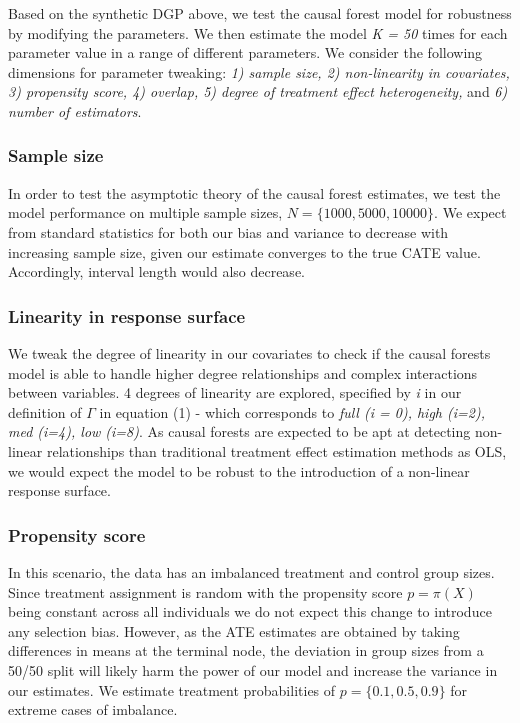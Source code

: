 \documentclass[12pt]{article}
\begin{document}
Based on the synthetic DGP above, we test the causal forest model for robustness by modifying the parameters. We then estimate the model \textit{K = 50} times for each parameter value in a range of different parameters. We consider the following dimensions for parameter tweaking: \textit{1) sample size, 2) non-linearity in covariates, 3) propensity score, 4) overlap, 5) degree of treatment effect heterogeneity,} and \textit{6) number of estimators}. 
\subsubsection{Sample size} 
In order to test the asymptotic theory of the causal forest estimates, we test the model performance on multiple sample sizes, $ N = \{1000, 5000, 10000\}$. We expect from standard statistics for both our bias and variance to decrease with increasing sample size, given our estimate converges to the true CATE value. Accordingly, interval length would also decrease.

\subsubsection{Linearity in response surface} 
We tweak the degree of linearity in our covariates to check if the causal forests model is able to handle higher degree relationships and complex interactions between variables. 4 degrees of linearity are explored, specified by \textit{i} in our definition of $\Gamma$ in equation (1) - which corresponds to \textit{full (i = 0), high (i=2), med (i=4), low (i=8)}. As causal forests are expected to be apt at detecting non-linear relationships than traditional treatment effect estimation methods as OLS, we would expect the model to be robust to the introduction of a non-linear response surface. 

\subsubsection{Propensity score} 
In this scenario, the data has an imbalanced treatment and control group sizes. Since treatment assignment is random with the propensity score $p = \pi(X)$ being constant across all individuals we do not expect this change to introduce any selection bias. However, as the ATE estimates are obtained by taking differences in means at the terminal node, the deviation in group sizes from a 50/50 split will likely harm the power of our model and increase the variance in our estimates. We estimate treatment probabilities of $p = \{0.1, 0.5, 0.9\}$ for extreme cases of imbalance. 
\end{document}
